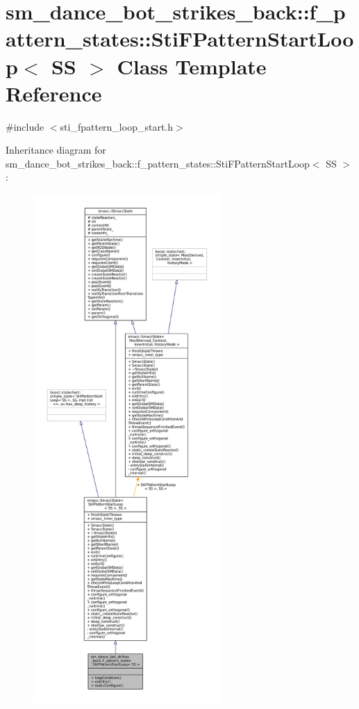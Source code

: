 \hypertarget{structsm__dance__bot__strikes__back_1_1f__pattern__states_1_1StiFPatternStartLoop}{}\section{sm\+\_\+dance\+\_\+bot\+\_\+strikes\+\_\+back\+:\+:f\+\_\+pattern\+\_\+states\+:\+:Sti\+F\+Pattern\+Start\+Loop$<$ SS $>$ Class Template Reference}
\label{structsm__dance__bot__strikes__back_1_1f__pattern__states_1_1StiFPatternStartLoop}


{\ttfamily \#include $<$sti\+\_\+fpattern\+\_\+loop\+\_\+start.\+h$>$}



Inheritance diagram for sm\+\_\+dance\+\_\+bot\+\_\+strikes\+\_\+back\+:\+:f\+\_\+pattern\+\_\+states\+:\+:Sti\+F\+Pattern\+Start\+Loop$<$ SS $>$\+:
\nopagebreak
\begin{figure}[H]
\begin{center}
\leavevmode
\includegraphics[height=550pt]{structsm__dance__bot__strikes__back_1_1f__pattern__states_1_1StiFPatternStartLoop__inherit__graph}
\end{center}
\end{figure}


